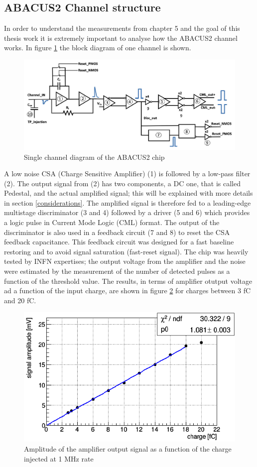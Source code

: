 \subsection{ABACUS2 Channel structure}
In order to understand the measurements from chapter 5 and the goal of this thesis work it is extremely important to analyse how the ABACUS2 channel works.
In figure \ref{fig:abacuschannel} the block diagram of one channel is shown.
\begin{figure}[H]
	\centering
	\includegraphics[width=0.8\linewidth]{IMG/ch2/Abacus_channel.png}
	\caption{Single channel diagram of the ABACUS2 chip}
	\label{fig:abacuschannel}
\end{figure}
\noindent A low noise CSA (Charge Sensitive Amplifier) (1) is followed by a low-pass filter (2).
The output signal from (2) has two components, a DC one, that is called Pedestal, and the actual amplified signal; this will be explained with more details in section \ref{considerations}.
The amplified signal is therefore fed to a leading-edge multistage discriminator (3 and 4) followed by a driver (5 and 6) which provides a logic pulse in Current Mode Logic (CML) format.
The output of the discriminator is also used in a feedback circuit (7 and 8) to reset the CSA feedback capacitance. This feedback circuit was designed for a fast baseline restoring and to avoid signal saturation (fast-reset signal).
The chip was heavily tested by INFN expertises; the output voltage from the amplifier and the noise were estimated by the measurement of the number of detected pulses as a function of the threshold value. The results, in terms of amplifier otutput voltage ad a function of the input charge, are shown in figure \ref{fig:abacustest} for charges between 3 fC and 20 fC\cite{abacus}.
\begin{figure}[H]
	\centering
	\includegraphics[width=0.6\linewidth]{IMG/ch2/ABACUSTEST}
	\caption{Amplitude of the amplifier output signal as a function of the charge injected at 1 MHz rate}
	\label{fig:abacustest}
\end{figure}

